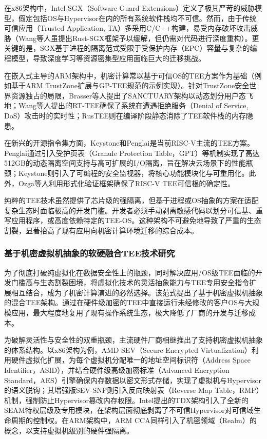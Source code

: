 \documentclass[master, vlined, review]{DissertUESTC}
\begin{document}
	在x86架构中，Intel SGX（Software Guard Extensions）定义了极其严苛的威胁模型，假定包括OS与Hypervisor在内的所有系统软件栈均不可信。然而，由于传统可信应用（Trusted Application, TA）多采用C/C++构建，易受内存破坏攻击威胁（Wang等人虽提出Rust-SGX框架予以缓解，但仍需对代码进行深度重构）。更关键的是，SGX基于进程的隔离范式受限于受保护内存（EPC）容量与复杂的编程模型，导致深度学习等资源密集型应用面临巨大的迁移挑战。
	
	在嵌入式主导的ARM架构中，机密计算常以基于可信OS的TEE方案作为基础（例如基于ARM TrustZone扩展与GP-TEE规范的示例实现）。针对TrustZone安全世界资源独占的局限，Brasser等人提出了SANCTUARY架构以动态划分用户态飞地；Wang等人提出的RT-TEE确保了系统在遭遇拒绝服务（Denial of Service, DoS）攻击时的实时性；RusTEE则在编译阶段静态消除了TEE软件栈的内存隐患。
	
	在新兴的开源指令集方面，Keystone和Penglai是当前RISC-V主流的TEE方案。Penglai通过引入受护页表（Granule Protection Table，GPT）等机制实现了高达512GB的动态隔离空间支持与高可扩展的I/O隔离，旨在解决云场景下的性能瓶颈；Keystone则引入了可编程的安全监视器，将核心功能模块化与可重用化。此外，Ozga等人利用形式化验证框架确保了RISC-V TEE可信根的确定性。
	
	纯粹的TEE技术虽然提供了芯片级的强隔离，但基于进程或OS抽象的方案在适配复杂生态时面临极高的开发门槛。开发者必须手动剥离敏感代码以划分可信基、重写应用程序，或高度依赖特定的TEE-OS。这种架构不可避免地导致了严重的生态割裂，显著抬高了现有应用向机密计算环境迁移的综合成本。
	
	\subsubsection{基于机密虚拟机抽象的软硬融合TEE技术研究}
	为了彻底打破纯虚拟化在数据安全性上的瓶颈，同时解决应用/OS级TEE面临的开发门槛高与生态割裂困境，将虚拟化技术的灵活抽象能力与TEE专用安全指令扩展相互结合，成为了机密计算演进的必然选择。该范式提出了基于机密虚拟机抽象的混合TEE架构。通过在硬件级加密的TEE中直接运行未经修改的客户OS与大规模应用，最大程度地复用了现有操作系统生态，极大降低了厂商的开发与迁移成本。
	
	为破解灵活性与安全性的双重瓶颈，主流硬件厂商相继推出了支持机密虚拟机抽象的体系结构。以x86架构为例，AMD SEV（Secure Encrypted Virtualization）利用硬件虚拟化扩展，为每个虚拟机分配唯一的地址空间标识符（Address Space Identifier，ASID），并结合硬件级高级加密标准（Advanced Encryption Standard，AES）引擎确保内存数据以密文形式存储，实现了虚拟机与Hypervisor的语义脱钩；其增强版SEV-SNP则引入反向映射表（Reverse Map Table，RMP）机制，强制防止Hypervisor篡改内存权限。Intel提出的TDX架构引入了全新的SEAM特权层级及专用模块，在架构层面彻底剥离了不可信Hypervisor对可信域生命周期的控制权。在ARM架构中，ARM CCA同样引入了机密领域（Realm）的概念，以支持虚拟机级别的硬件强隔离。
	
\end{document}
